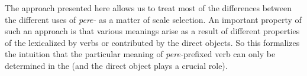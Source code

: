 


The approach presented here allows us to treat most of the differences between the different uses of \textit{pere-} as a matter of scale selection. An important property of such an approach is that various meanings arise as a result of different properties of the  lexicalized by verbs or contributed by the direct objects. So this formalizes the intuition that the particular meaning of \textit{pere-}prefixed verb can only be determined in the  (and the direct object plays a crucial role). 


